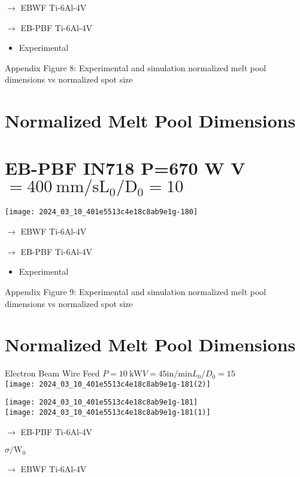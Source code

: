 \documentclass[10pt]{article}
\begin{document}
$\longrightarrow$ EBWF Ti-6Al-4V

$\longrightarrow$ EB-PBF Ti-6Al-4V

\begin{itemize}
  \item Experimental
\end{itemize}

Appendix Figure 8: Experimental and simulation normalized melt pool dimensions vs normalized spot size

\section*{Normalized Melt Pool Dimensions}
\section*{EB-PBF IN718 P=670 W V $=400 \mathrm{~mm} / \mathrm{s} \mathrm{L}_{0} / \mathrm{D}_{0}=10$}
\begin{center}
\texttt{[image: 2024\_03\_10\_401e5513c4e18c8ab9e1g-180]}
\end{center}

$\longrightarrow$ EBWF Ti-6Al-4V

$\rightarrow$ EB-PBF Ti-6Al-4V

\begin{itemize}
  \item Experimental
\end{itemize}

Appendix Figure 9: Experimental and simulation normalized melt pool dimensions vs normalized spot size

\section*{Normalized Melt Pool Dimensions}
Electron Beam Wire Feed $P=10 \mathrm{~kW} V=45 \mathrm{in} / \mathrm{min} L_{0} / D_{0}=15$\\
\texttt{[image: 2024\_03\_10\_401e5513c4e18c8ab9e1g-181(2)]}

\texttt{[image: 2024\_03\_10\_401e5513c4e18c8ab9e1g-181]}\\
\texttt{[image: 2024\_03\_10\_401e5513c4e18c8ab9e1g-181(1)]}

$\rightarrow$ EB-PBF Ti-6Al-4V

$\sigma / \mathrm{W}_{0}$

$\rightarrow$ EBWF Ti-6Al-4V
\end{document}
